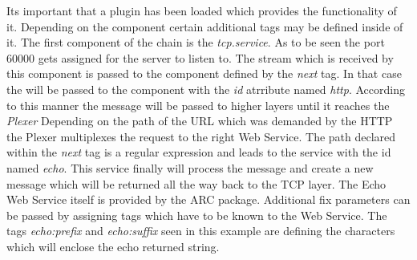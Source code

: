 Its important that a plugin has been loaded which provides the functionality of it.
Depending on the component certain additional tags may be defined inside of it.
The first component of the chain is the \textit{tcp.service}. As to be seen the port 60000 gets assigned for the server to listen to.
The stream which is received by this component is passed to the component defined by the \textit{next} tag.
In that case the will be passed to the component with the \textit{id} atrribute named \textit{http}. According to this manner the message will be passed to higher layers until it reaches the \textit{Plexer}  Depending on the path of the URL which was demanded by the HTTP the Plexer multiplexes the request to the right Web Service. The path declared within the \textit{next} tag is a regular expression and leads to the service with the id named \textit{echo}. This service finally will process the message and create a new message which will be returned all the way back to the TCP layer. The Echo Web Service itself is provided by the ARC package. Additional fix parameters can be passed by assigning tags which have to be known to the Web Service.
The tags \textit{echo:prefix} and \textit{echo:suffix} seen in this example are defining the characters which will enclose the echo  returned string.
\\



